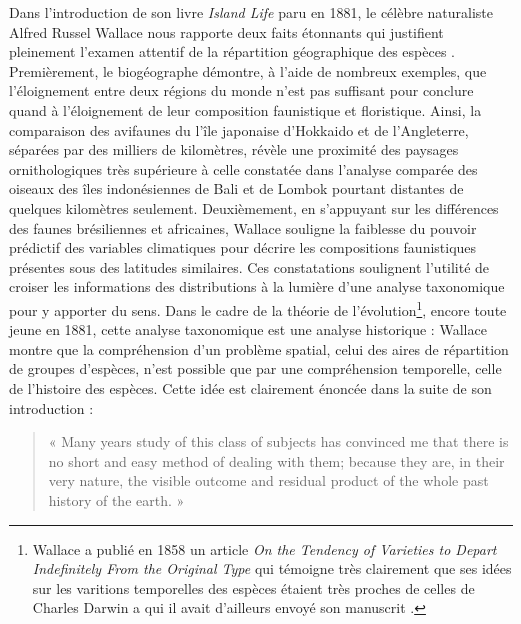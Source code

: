 Dans l'introduction de son livre \emph{Island Life} paru en 1881, le
célèbre naturaliste Alfred Russel Wallace nous rapporte deux faits
étonnants qui justifient pleinement l'examen attentif de la répartition
géographique des espèces \citep{wallace1881island}. Premièrement, le
biogéographe démontre, à l'aide de nombreux exemples, que l'éloignement
entre deux régions du monde n'est pas suffisant pour conclure quand à
l'éloignement de leur composition faunistique et floristique. Ainsi, la
comparaison des avifaunes du l'île japonaise d'Hokkaido et de
l'Angleterre, séparées par des milliers de kilomètres, révèle une
proximité des paysages ornithologiques très supérieure à celle constatée
dans l'analyse comparée des oiseaux des îles indonésiennes de Bali et de
Lombok pourtant distantes de quelques kilomètres seulement.
Deuxièmement, en s'appuyant sur les différences des faunes brésiliennes
et africaines, Wallace souligne la faiblesse du pouvoir prédictif des
variables climatiques pour décrire les compositions faunistiques
présentes sous des latitudes similaires. Ces constatations soulignent
l'utilité de croiser les informations des distributions à la lumière
d'une analyse taxonomique pour y apporter du sens. Dans le cadre de la
théorie de l'évolution\footnote{Wallace a publié en 1858 un article
  \emph{On the Tendency of Varieties to Depart Indefinitely From the
  Original Type} qui témoigne très clairement que ses idées sur les
  varitions temporelles des espèces étaient très proches de celles de
  Charles Darwin a qui il avait d'ailleurs envoyé son manuscrit
  \citep{Wallace1858}.}, encore toute jeune en 1881, cette analyse
taxonomique est une analyse historique : Wallace montre que la
compréhension d'un problème spatial, celui des aires de répartition de
groupes d'espèces, n'est possible que par une compréhension temporelle,
celle de l'histoire des espèces. Cette idée est clairement énoncée dans
la suite de son introduction :

\begin{quote}
« Many years study of this class of subjects has convinced me that there
is no short and easy method of dealing with them; because they are, in
their very nature, the visible outcome and residual product of the whole
past history of the earth. »
\end{quote}

